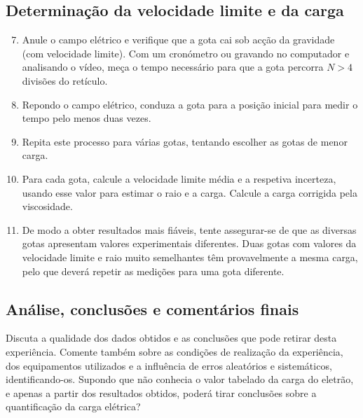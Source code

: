 \documentclass[12pt,a4paper,oneside]{paper}
\begin{document}
 \subsection{\sf Determinação da velocidade limite e da carga}
 \begin{enumerate}
 \setcounter{enumi}{6}

\item Anule o campo elétrico  e verifique que a gota cai sob acção da gravidade (com velocidade limite). 
Com um cronómetro ou gravando no computador e analisando o vídeo, meça o tempo necessário para que a gota percorra  $N>4$ divisões
do retículo. 
\item Repondo o campo elétrico, conduza a gota para a posição inicial para  medir o tempo pelo menos duas vezes. 

\item Repita este processo para várias gotas, tentando escolher as gotas de menor carga.

\item   Para cada gota, calcule a velocidade limite média e a respetiva incerteza, usando esse valor para estimar o raio e 
a carga. Calcule a carga corrigida pela viscosidade.

\item De modo a obter resultados mais fiáveis, tente assegurar-se de que as diversas gotas apresentam valores experimentais
diferentes. Duas gotas com valores da velocidade limite e raio muito semelhantes têm provavelmente a mesma carga, pelo que deverá repetir as medições para uma gota diferente.
\end{enumerate}

\subsection{\sf Análise, conclusões e comentários finais}
Discuta a qualidade dos dados obtidos e as conclusões que pode retirar desta experiência. Comente também sobre as condições
de realização da experiência, dos equipamentos utilizados e a influência de erros aleatórios e sistemáticos, identificando-os. Supondo que não conhecia o valor tabelado da carga do eletrão, e apenas a partir dos resultados obtidos, poderá tirar conclusões sobre a quantificação da carga elétrica?
\end{document}

